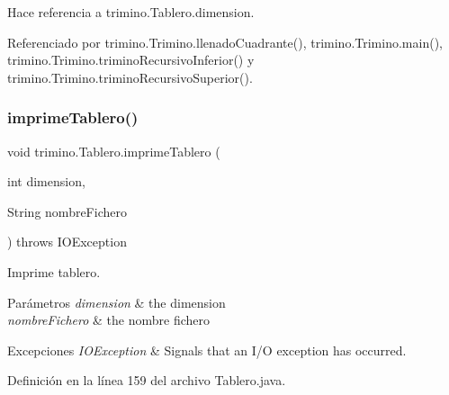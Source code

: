 Hace referencia a trimino.\+Tablero.\+dimension.



Referenciado por trimino.\+Trimino.\+llenado\+Cuadrante(), trimino.\+Trimino.\+main(), trimino.\+Trimino.\+trimino\+Recursivo\+Inferior() y trimino.\+Trimino.\+trimino\+Recursivo\+Superior().

\mbox{\label{classtrimino_1_1Tablero_aafa29cfec6831d2ad31eeb715eb93bee}} 
\subsubsection{\texorpdfstring{imprimeTablero()}{imprimeTablero()}}
{\footnotesize\ttfamily void trimino.\+Tablero.\+imprime\+Tablero (\begin{DoxyParamCaption}\item[{int}]{dimension,  }\item[{String}]{nombre\+Fichero }\end{DoxyParamCaption}) throws I\+O\+Exception}



Imprime tablero. 


\begin{DoxyParams}{Parámetros}
{\em dimension} & the dimension \\
\hline
{\em nombre\+Fichero} & the nombre fichero \\
\hline
\end{DoxyParams}

\begin{DoxyExceptions}{Excepciones}
{\em I\+O\+Exception} & Signals that an I/O exception has occurred. \\
\hline
\end{DoxyExceptions}


Definición en la línea 159 del archivo Tablero.\+java.



